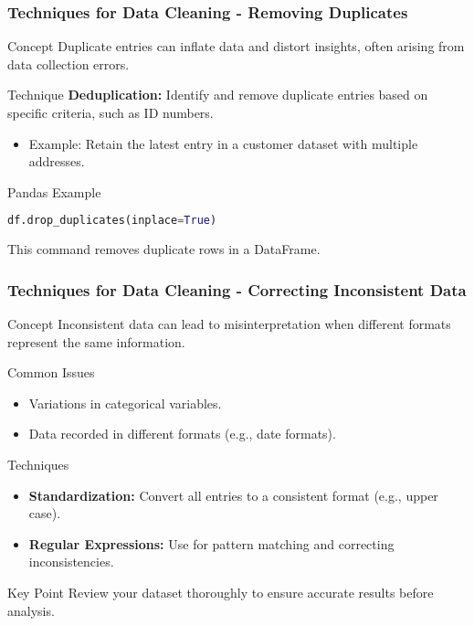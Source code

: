 \documentclass[aspectratio=169]{beamer}
\begin{document}
\begin{frame}[fragile]
    \frametitle{Techniques for Data Cleaning - Removing Duplicates}
    \begin{block}{Concept}
        Duplicate entries can inflate data and distort insights, often arising from data collection errors.
    \end{block}

    \begin{block}{Technique}
        \textbf{Deduplication:} Identify and remove duplicate entries based on specific criteria, such as ID numbers.
        \begin{itemize}
            \item Example: Retain the latest entry in a customer dataset with multiple addresses.
        \end{itemize}
    \end{block}

    \begin{block}{Pandas Example}
        \begin{lstlisting}[language=Python]
df.drop_duplicates(inplace=True)
        \end{lstlisting}
        This command removes duplicate rows in a DataFrame.
    \end{block}
\end{frame}

\begin{frame}[fragile]
    \frametitle{Techniques for Data Cleaning - Correcting Inconsistent Data}
    \begin{block}{Concept}
        Inconsistent data can lead to misinterpretation when different formats represent the same information.
    \end{block}

    \begin{block}{Common Issues}
        \begin{itemize}
            \item Variations in categorical variables.
            \item Data recorded in different formats (e.g., date formats).
        \end{itemize}
    \end{block}

    \begin{block}{Techniques}
        \begin{itemize}
            \item \textbf{Standardization:} Convert all entries to a consistent format (e.g., upper case).
            \item \textbf{Regular Expressions:} Use for pattern matching and correcting inconsistencies.
        \end{itemize}
    \end{block}

    \begin{block}{Key Point}
        Review your dataset thoroughly to ensure accurate results before analysis.
    \end{block}
\end{frame}
\end{document}
